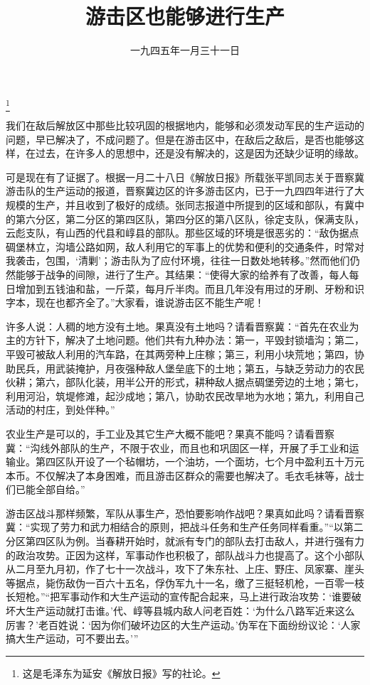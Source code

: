 
\title{游击区也能够进行生产}
\date{一九四五年一月三十一日}
\thanks{这是毛泽东为延安《解放日报》写的社论。}
\maketitle


我们在敌后解放区中那些比较巩固的根据地内，能够和必须发动军民的生产运动的问题，早已解决了，不成问题了。但是在游击区中，在敌后之敌后，是否也能够这样，在过去，在许多人的思想中，还是没有解决的，这是因为还缺少证明的缘故。

可是现在有了证据了。根据一月二十八日《解放日报》所载张平凯同志关于晋察冀游击队的生产运动的报道，晋察冀边区的许多游击区内，已于一九四四年进行了大规模的生产，并且收到了极好的成绩。张同志报道中所提到的区域和部队，有冀中的第六分区，第二分区的第四区队，第四分区的第八区队，徐定支队，保满支队，云彪支队，有山西的代县和崞县的部队。那些区域的环境是很恶劣的：“敌伪据点碉堡林立，沟墙公路如网，敌人利用它的军事上的优势和便利的交通条件，时常对我袭击，包围，‘清剿’；游击队为了应付环境，往往一日数处地转移。”然而他们仍然能够于战争的间隙，进行了生产。其结果：“使得大家的给养有了改善，每人每日增加到五钱油和盐，一斤菜，每月斤半肉。而且几年没有用过的牙刷、牙粉和识字本，现在也都齐全了。”大家看，谁说游击区不能生产呢！

许多人说：人稠的地方没有土地。果真没有土地吗？请看晋察冀：“首先在农业为主的方针下，解决了土地问题。他们共有九种办法：第一，平毁封锁墙沟；第二，平毁可被敌人利用的汽车路，在其两旁种上庄稼；第三，利用小块荒地；第四，协助民兵，用武装掩护，月夜强种敌人堡垒底下的土地；第五，与缺乏劳动力的农民伙耕；第六，部队化装，用半公开的形式，耕种敌人据点碉堡旁边的土地；第七，利用河沿，筑堤修滩，起沙成地；第八，协助农民改旱地为水地；第九，利用自己活动的村庄，到处伴种。”

农业生产是可以的，手工业及其它生产大概不能吧？果真不能吗？请看晋察冀：“沟线外部队的生产，不限于农业，而且也和巩固区一样，开展了手工业和运输业。第四区队开设了一个毡帽坊，一个油坊，一个面坊，七个月中盈利五十万元本币。不仅解决了本身困难，而且游击区群众的需要也解决了。毛衣毛袜等，战士们已能全部自给。”

游击区战斗那样频繁，军队从事生产，恐怕要影响作战吧？果真如此吗？请看晋察冀：“实现了劳力和武力相结合的原则，把战斗任务和生产任务同样看重。”“以第二分区第四区队为例。当春耕开始时，就派有专门的部队去打击敌人，并进行强有力的政治攻势。正因为这样，军事动作也积极了，部队战斗力也提高了。这个小部队从二月至九月初，作了七十一次战斗，攻下了朱东社、上庄、野庄、凤家寨、崖头等据点，毙伤敌伪一百六十五名，俘伪军九十一名，缴了三挺轻机枪，一百零一枝长短枪。”“把军事动作和大生产运动的宣传配合起来，马上进行政治攻势：‘谁要破坏大生产运动就打击谁。’代、崞等县城内敌人问老百姓：‘为什么八路军近来这么厉害？’老百姓说：‘因为你们破坏边区的大生产运动。’伪军在下面纷纷议论：‘人家搞大生产运动，可不要出去。’”

